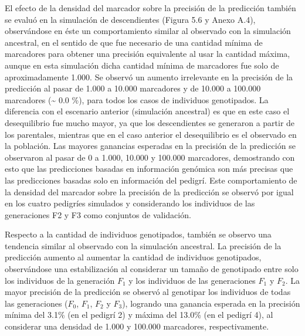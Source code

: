 \documentclass[11pt,spanish,a4paper,oneside,]{book} %
\begin{document}
\hspace*{1em}

El efecto de la densidad del marcador sobre la precisión de la predicción también se evaluó en la simulación de descendientes (Figura 5.6 y Anexo A.4), observándose en éste un comportamiento similar al observado con la simulación ancestral, en el sentido de que fue necesario de una cantidad mínima de marcadores para obtener una precisión equivalente al usar la cantidad máxima, aunque en esta simulación dicha cantidad mínima de marcadores fue solo de aproximadamente 1.000. Se observó un aumento irrelevante en la precisión de la predicción al pasar de 1.000 a 10.000 marcadores y de 10.000 a 100.000 marcadores (\textasciitilde{} 0.0 \%), para todos los casos de individuos genotipados. La diferencia con el escenario anterior (simulación ancestral) es que en este caso el desequilibrio fue mucho mayor, ya que los descendientes se generaron a partir de los parentales, mientras que en el caso anterior el desequilibrio es el observado en la población. Las mayores ganancias esperadas en la precisión de la predicción se observaron al pasar de 0 a 1.000, 10.000 y 100.000 marcadores, demostrando con esto que las predicciones basadas en información genómica son más precisas que las predicciones basadas solo en información del pedigrí. Este comportamiento de la densidad del marcador sobre la precisión de la predicción se observó por igual en los cuatro pedigríes simulados y considerando los individuos de las generaciones F2 y F3 como conjuntos de validación.

Respecto a la cantidad de individuos genotipados, también se observo una tendencia similar al observado con la simulación ancestral. La precisión de la predicción aumento al aumentar la cantidad de individuos genotipados, observándose una estabilización al considerar un tamaño de genotipado entre solo los individuos de la generación \(F_{1}\) y los individuos de las generaciones \(F_{1}\) y \(F_{2}\). La mayor precisión de la predicción se observó al genotipar los individuos de todas las generaciones (\(F_{0}\), \(F_{1}\), \(F_{2}\) y \(F_{3}\)), logrando una ganancia esperada en la precisión mínima del 3.1\% (en el pedigrí 2) y máxima del 13.0\% (en el pedigrí 4), al considerar una densidad de 1.000 y 100.000 marcadores, respectivamente.
\end{document}
